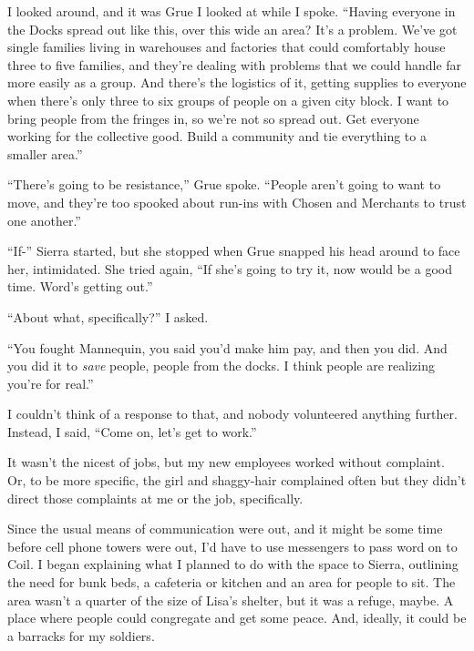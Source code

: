 I looked around, and it was Grue I looked at while I spoke.  ``Having everyone in the Docks spread out like this, over this wide an area?  It's a problem.  We've got single families living in warehouses and factories that could comfortably house three to five families, and they're dealing with problems that we could handle far more easily as a group.  And there's the logistics of it, getting supplies to everyone when there's only three to six groups of people on a given city block.  I want to bring people from the fringes in, so we're not so spread out.  Get everyone working for the collective good.  Build a community and tie everything to a smaller area.''



``There's going to be resistance,'' Grue spoke.  ``People aren't going to want to move, and they're too spooked about run-ins with Chosen and Merchants to trust one another.''



``If-'' Sierra started, but she stopped when Grue snapped his head around to face her, intimidated.  She tried again, ``If she's going to try it, now would be a good time.  Word's getting out.''



``About what, specifically?'' I asked.



``You fought Mannequin, you said you'd make him pay, and then you did.  And you did it to \emph{save }people, people from the docks.  I think people are realizing you're for real.''



I couldn't think of a response to that, and nobody volunteered anything further.  Instead, I said, ``Come on, let's get to work.''



It wasn't the nicest of jobs, but my new employees worked without complaint.  Or, to be more specific, the girl and shaggy-hair complained often but they didn't direct those complaints at me or the job, specifically.



Since the usual means of communication were out, and it might be some time before cell phone towers were out, I'd have to use messengers to pass word on to Coil.  I began explaining what I planned to do with the space to Sierra, outlining the need for bunk beds, a cafeteria or kitchen and an area for people to sit.  The area wasn't a quarter of the size of Lisa's shelter, but it was a refuge, maybe.  A place where people could congregate and get some peace.  And, ideally, it could be a barracks for my soldiers.



